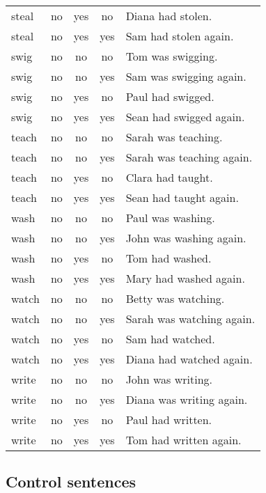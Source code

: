 \begin{longtable}{l|ccc|p{5cm}}
steal     & no   & yes  & no   & Diana had stolen.           \\
steal     & no   & yes  & yes  & Sam had stolen again.       \\
swig      & no   & no   & no   & Tom was swigging.           \\
swig      & no   & no   & yes  & Sam was swigging again.     \\
swig      & no   & yes  & no   & Paul had swigged.           \\
swig      & no   & yes  & yes  & Sean had swigged again.     \\
teach     & no   & no   & no   & Sarah was teaching.         \\
teach     & no   & no   & yes  & Sarah was teaching again.   \\
teach     & no   & yes  & no   & Clara had taught.           \\
teach     & no   & yes  & yes  & Sean had taught again.      \\
wash      & no   & no   & no   & Paul was washing.           \\
wash      & no   & no   & yes  & John was washing again.     \\
wash      & no   & yes  & no   & Tom had washed.             \\
wash      & no   & yes  & yes  & Mary had washed again.      \\
watch     & no   & no   & no   & Betty was watching.         \\
watch     & no   & no   & yes  & Sarah was watching again.   \\
watch     & no   & yes  & no   & Sam had watched.            \\
watch     & no   & yes  & yes  & Diana had watched again.    \\
write     & no   & no   & no   & John was writing.           \\
write     & no   & no   & yes  & Diana was writing again.    \\
write     & no   & yes  & no   & Paul had written.           \\
write     & no   & yes  & yes  & Tom had written again.     
\end{longtable}

\subsection{Control sentences}


